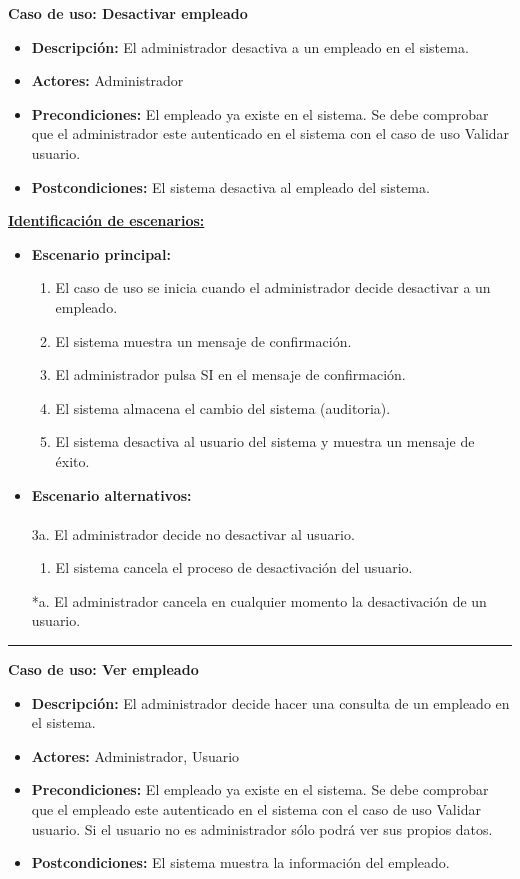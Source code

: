 \textbf{Caso de uso: Desactivar empleado}
\begin{itemize}\renewcommand{\labelitemi}{$\cdot$}
 \item \textbf{Descripción:} El administrador desactiva a un empleado en el sistema.
  \item \textbf{Actores:} Administrador
  \item \textbf{Precondiciones:} El empleado ya existe en el sistema. Se debe comprobar que el administrador este autenticado en el sistema con el caso de uso Validar usuario.
  \item \textbf{Postcondiciones:} El sistema desactiva al empleado del sistema.
\end{itemize}
\underline{\textbf{Identificación de escenarios:}}
\begin{itemize}\renewcommand{\labelitemi}{$\circ$}
 \item \textbf{Escenario principal:}
         \begin{enumerate}
          \item El caso de uso se inicia cuando el administrador decide desactivar a un empleado.
          \item El sistema muestra un mensaje de confirmación.
          \item El administrador pulsa SI en el mensaje de confirmación.
 	  \item El sistema almacena el cambio del sistema (auditoria).
	   \item El sistema desactiva al usuario del sistema y muestra un mensaje de éxito.
         \end{enumerate}
  \item \textbf{Escenario alternativos:}\\\\
           3a. El administrador decide no desactivar al usuario.
		\begin{enumerate}
		 \item El sistema cancela el proceso de desactivación del usuario.
		\end{enumerate}
          *a. El administrador cancela en cualquier momento la desactivación de un usuario.
\end{itemize}
\smallskip
\hrule height 1pt
\smallskip
\textbf{Caso de uso: Ver empleado}
\begin{itemize}\renewcommand{\labelitemi}{$\cdot$}
 \item \textbf{Descripción:} El administrador decide hacer una consulta de un empleado en el sistema.
  \item \textbf{Actores:} Administrador, Usuario
  \item \textbf{Precondiciones:} El empleado ya existe en el sistema. Se debe comprobar que el empleado este autenticado en el sistema con el caso de uso Validar usuario. Si el usuario no es administrador sólo podrá ver sus propios datos.
  \item \textbf{Postcondiciones:} El sistema muestra la información del empleado.
\end{itemize}
